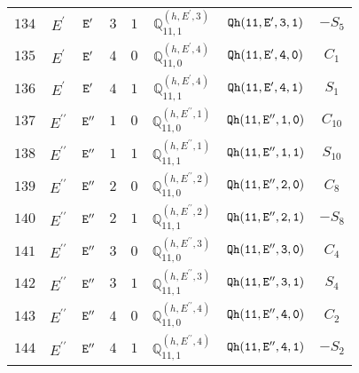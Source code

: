 \documentclass[fleqn,8pt]{jsarticle}
\begin{document}
\begin{table}[ht!]
\begin{center}
\begin{tabular}{cccccccc}
$ 134 $ & $ E^{\prime} $ & $ {\tt E'} $ & $ 3 $ & $ 1 $ & $ \mathbb{Q}_{11,1}^{(h,E^{\prime},3)} $ & $ {\tt Qh(11,E',3,1)} $ & $ - S_{5} $ \\
$ 135 $ & $ E^{\prime} $ & $ {\tt E'} $ & $ 4 $ & $ 0 $ & $ \mathbb{Q}_{11,0}^{(h,E^{\prime},4)} $ & $ {\tt Qh(11,E',4,0)} $ & $ C_{1} $ \\
$ 136 $ & $ E^{\prime} $ & $ {\tt E'} $ & $ 4 $ & $ 1 $ & $ \mathbb{Q}_{11,1}^{(h,E^{\prime},4)} $ & $ {\tt Qh(11,E',4,1)} $ & $ S_{1} $ \\
$ 137 $ & $ E^{\prime\prime} $ & $ {\tt E''} $ & $ 1 $ & $ 0 $ & $ \mathbb{Q}_{11,0}^{(h,E^{\prime\prime},1)} $ & $ {\tt Qh(11,E'',1,0)} $ & $ C_{10} $ \\
$ 138 $ & $ E^{\prime\prime} $ & $ {\tt E''} $ & $ 1 $ & $ 1 $ & $ \mathbb{Q}_{11,1}^{(h,E^{\prime\prime},1)} $ & $ {\tt Qh(11,E'',1,1)} $ & $ S_{10} $ \\
$ 139 $ & $ E^{\prime\prime} $ & $ {\tt E''} $ & $ 2 $ & $ 0 $ & $ \mathbb{Q}_{11,0}^{(h,E^{\prime\prime},2)} $ & $ {\tt Qh(11,E'',2,0)} $ & $ C_{8} $ \\
$ 140 $ & $ E^{\prime\prime} $ & $ {\tt E''} $ & $ 2 $ & $ 1 $ & $ \mathbb{Q}_{11,1}^{(h,E^{\prime\prime},2)} $ & $ {\tt Qh(11,E'',2,1)} $ & $ - S_{8} $ \\
$ 141 $ & $ E^{\prime\prime} $ & $ {\tt E''} $ & $ 3 $ & $ 0 $ & $ \mathbb{Q}_{11,0}^{(h,E^{\prime\prime},3)} $ & $ {\tt Qh(11,E'',3,0)} $ & $ C_{4} $ \\
$ 142 $ & $ E^{\prime\prime} $ & $ {\tt E''} $ & $ 3 $ & $ 1 $ & $ \mathbb{Q}_{11,1}^{(h,E^{\prime\prime},3)} $ & $ {\tt Qh(11,E'',3,1)} $ & $ S_{4} $ \\
$ 143 $ & $ E^{\prime\prime} $ & $ {\tt E''} $ & $ 4 $ & $ 0 $ & $ \mathbb{Q}_{11,0}^{(h,E^{\prime\prime},4)} $ & $ {\tt Qh(11,E'',4,0)} $ & $ C_{2} $ \\
$ 144 $ & $ E^{\prime\prime} $ & $ {\tt E''} $ & $ 4 $ & $ 1 $ & $ \mathbb{Q}_{11,1}^{(h,E^{\prime\prime},4)} $ & $ {\tt Qh(11,E'',4,1)} $ & $ - S_{2} $ \\
 \hline \hline
\end{tabular}
\end{center}
\end{table}
\end{document}
